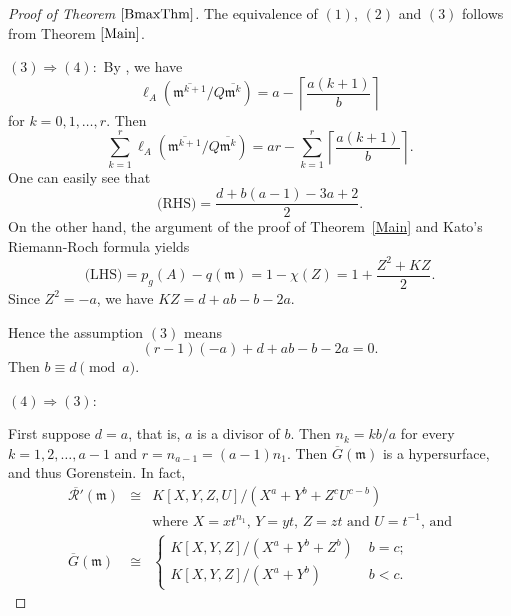 \documentclass[12pt]{amsart}
\theoremstyle{definition}
\theoremstyle{remark}
\numberwithin{equation}{section}
\newcommand{\thmref}[1]{Theorem~\ref{#1}}
\newcommand{\m}{\mathfrak m}
\renewcommand{\:}{\colon}
\begin{document}
\begin{proof}[Proof of Theorem $\ref{BmaxThm}$]
The equivalence of $(1)$, $(2)$ and $(3)$ follows from 
Theorem $\ref{Main}$. 
\par \vspace{2mm} \par \noindent 
$(3) \Longrightarrow (4):$
By \cite[Proposition 3.8(1)]{OWY4}, we have 
\[
\ell_A(\overline{\m^{k+1}}/Q\overline{\m^k}) 
= a - \left\lceil \dfrac{a(k+1)}{b} \right\rceil 
\]
for $k=0,1,\ldots,r$. 
Then 
\[
\sum_{k=1}^r \ell_A(\overline{\m^{k+1}}/Q\overline{\m^k}) 
= ar - \sum_{k=1}^r \left\lceil \dfrac{a(k+1)}{b} \right\rceil.  
\]
One can easily see that 
\[
\text{(RHS)}=\dfrac{d+b(a-1)-3a+2}{2}. 
\]
On the other hand, 
 the argument of the proof of \thmref{Main} and 
Kato's Riemann-Roch formula yields 
\[
\text{(LHS)}=p_g(A)-q(\m)=1-\chi(Z)=1+\dfrac{Z^2+KZ}{2}. 
\]
Since $Z^2=-a$, we have $KZ=d+ab-b-2a$. 
\par \vspace{1mm}
Hence the assumption $(3)$ means 
\[
(r-1)(-a)+d+ab-b-2a=0. 
\]
Then $b \equiv d \pmod{a}$. 
\par \vspace{2mm} \par \noindent 
$(4) \Longrightarrow (3):$
\par
First suppose $d=a$, that is, $a$ is a divisor of $b$. 
Then $n_k=kb/a$ for every $k=1,2,\ldots,a-1$ and 
$r=n_{a-1}=(a-1)n_1$. 
Then $\overline{G}(\m)$ is a hypersurface, and thus Gorenstein. In fact, 
\begin{eqnarray*}
\overline{\mathcal{R}'}(\m) 
& \cong &  K[X,Y,Z,U]/(X^a+Y^b+Z^cU^{c-b}) \\[2mm]
&  & \text{where $X=xt^{n_1}$, $Y=yt$, $Z=zt$ and $U=t^{-1}$, and}  \\[2mm] 
\overline{G}(\m) & \cong &
\left\{ 
\begin{array}{ll}
K[X,Y,Z]/(X^a+Y^b+Z^b) & \;\text{$b=c$;} \\
K[X,Y,Z]/(X^a+Y^b) & \;\text{$b<c$}. 
\end{array}
\right.
\end{eqnarray*}


\end{proof}
\end{document}
